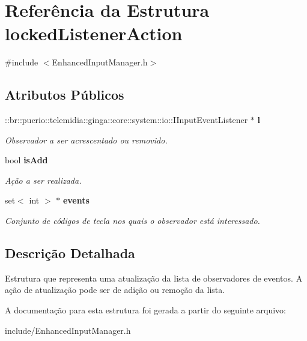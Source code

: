 \section{Referência da Estrutura lockedListenerAction}
\label{structlockedListenerAction}


{\ttfamily \#include $<$EnhancedInputManager.h$>$}

\subsection*{Atributos Públicos}
\begin{DoxyCompactItemize}
\item 
::br::pucrio::telemidia::ginga::core::system::io::IInputEventListener $\ast$ {\bf l}\label{structlockedListenerAction_a28230643be4f12da017cdde08592e7d5}

\begin{DoxyCompactList}\small\item\em Observador a ser acrescentado ou removido. \item\end{DoxyCompactList}\item 
bool {\bf isAdd}\label{structlockedListenerAction_aa94d3365e82705a04886ca1851fef123}

\begin{DoxyCompactList}\small\item\em Ação a ser realizada. \item\end{DoxyCompactList}\item 
set$<$ int $>$ $\ast$ {\bf events}\label{structlockedListenerAction_a854e24c44ca05d7779d2269cd6a07b7c}

\begin{DoxyCompactList}\small\item\em Conjunto de códigos de tecla nos quais o observador está interessado. \item\end{DoxyCompactList}\end{DoxyCompactItemize}


\subsection{Descrição Detalhada}
Estrutura que representa uma atualização da lista de observadores de eventos. A ação de atualização pode ser de adição ou remoção da lista. 

A documentação para esta estrutura foi gerada a partir do seguinte arquivo:\begin{DoxyCompactItemize}
\item 
include/EnhancedInputManager.h\end{DoxyCompactItemize}
